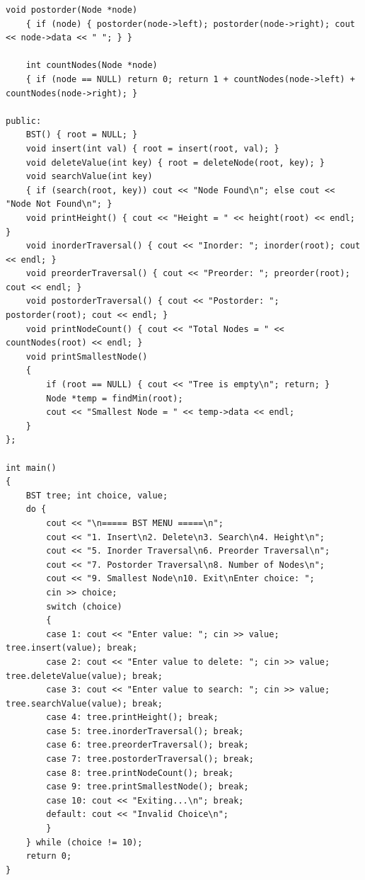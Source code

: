 \documentclass[a4paper,12pt]{article}
\begin{document}
\begin{lstlisting}[style=cppstyle]
    void postorder(Node *node)
    { if (node) { postorder(node->left); postorder(node->right); cout << node->data << " "; } }

    int countNodes(Node *node)
    { if (node == NULL) return 0; return 1 + countNodes(node->left) + countNodes(node->right); }

public:
    BST() { root = NULL; }
    void insert(int val) { root = insert(root, val); }
    void deleteValue(int key) { root = deleteNode(root, key); }
    void searchValue(int key)
    { if (search(root, key)) cout << "Node Found\n"; else cout << "Node Not Found\n"; }
    void printHeight() { cout << "Height = " << height(root) << endl; }
    void inorderTraversal() { cout << "Inorder: "; inorder(root); cout << endl; }
    void preorderTraversal() { cout << "Preorder: "; preorder(root); cout << endl; }
    void postorderTraversal() { cout << "Postorder: "; postorder(root); cout << endl; }
    void printNodeCount() { cout << "Total Nodes = " << countNodes(root) << endl; }
    void printSmallestNode()
    {
        if (root == NULL) { cout << "Tree is empty\n"; return; }
        Node *temp = findMin(root);
        cout << "Smallest Node = " << temp->data << endl;
    }
};

int main()
{
    BST tree; int choice, value;
    do {
        cout << "\n===== BST MENU =====\n";
        cout << "1. Insert\n2. Delete\n3. Search\n4. Height\n";
        cout << "5. Inorder Traversal\n6. Preorder Traversal\n";
        cout << "7. Postorder Traversal\n8. Number of Nodes\n";
        cout << "9. Smallest Node\n10. Exit\nEnter choice: ";
        cin >> choice;
        switch (choice)
        {
        case 1: cout << "Enter value: "; cin >> value; tree.insert(value); break;
        case 2: cout << "Enter value to delete: "; cin >> value; tree.deleteValue(value); break;
        case 3: cout << "Enter value to search: "; cin >> value; tree.searchValue(value); break;
        case 4: tree.printHeight(); break;
        case 5: tree.inorderTraversal(); break;
        case 6: tree.preorderTraversal(); break;
        case 7: tree.postorderTraversal(); break;
        case 8: tree.printNodeCount(); break;
        case 9: tree.printSmallestNode(); break;
        case 10: cout << "Exiting...\n"; break;
        default: cout << "Invalid Choice\n";
        }
    } while (choice != 10);
    return 0;
}
\end{lstlisting}
\end{document}
